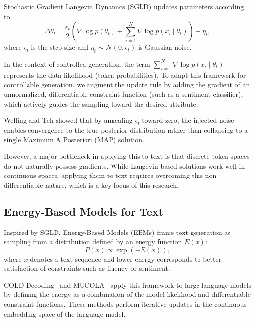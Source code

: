 \documentclass[11pt]{article}
\begin{document}
Stochastic Gradient Langevin Dynamics (SGLD) updates parameters according to
\begin{equation}
\Delta \theta_t =
\frac{\epsilon_t}{2}
\left(
\nabla \log p(\theta_t) +
\sum_{i=1}^{N} \nabla \log p(x_i \mid \theta_t)
\right)
+ \eta_t,
\end{equation}
where $\epsilon_t$ is the step size and $\eta_t \sim \mathcal{N}(0, \epsilon_t)$ is Gaussian noise.


In the context of controlled generation, the term 
\(\sum_{i=1}^{N} \nabla \log p(x_i \mid \theta_t)\)
represents the data likelihood (token probabilities). To adapt this framework for controllable generation, we augment the update rule by adding the gradient of an unnormalized, differentiable constraint function (such as a sentiment classifier), which actively guides the sampling toward the desired attribute.
 
Welling and Teh showed that by annealing $\epsilon_t$ toward zero, the injected noise enables convergence to the true posterior distribution rather than collapsing to a single Maximum A Posteriori (MAP) solution. 

However, a major bottleneck in applying this to text is that discrete token spaces do not naturally possess gradients. While Langevin-based solutions work well in continuous spaces, applying them to text requires overcoming this non-differentiable nature, which is a key focus of this research.

\subsection{Energy-Based Models for Text}

Inspired by SGLD, Energy-Based Models (EBMs) frame text generation as sampling from a distribution defined by an energy function $E(x)$:
\begin{equation}
P(x) \propto \exp(-E(x)),
\end{equation}
where $x$ denotes a text sequence and lower energy corresponds to better satisfaction of constraints such as fluency or sentiment.

COLD Decoding~\cite{10.5555/3600270.3600963} and MUCOLA~\cite{kumar2022gradientbasedconstrainedsamplinglanguage} apply this framework to large language models by defining the energy as a combination of the model likelihood and differentiable constraint functions. These methods perform iterative updates in the continuous embedding space of the language model.
\end{document}

